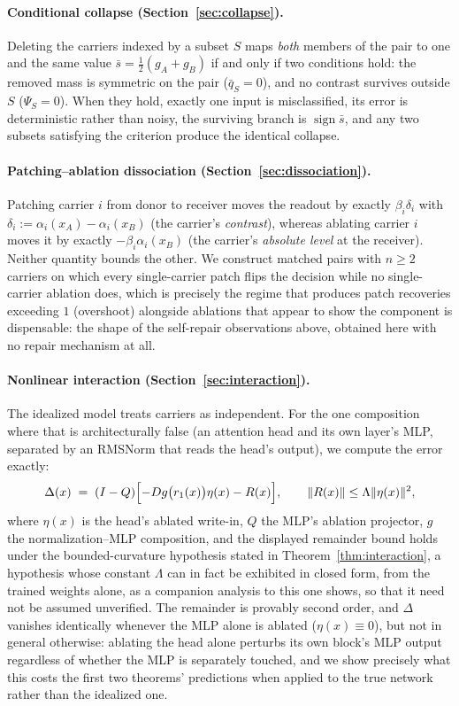 \documentclass[11pt,a4paper]{article}
\begin{document}
\paragraph{Conditional collapse (Section~\ref{sec:collapse}).} Deleting the
carriers indexed by a subset $S$ maps \emph{both} members of the pair to one
and the same value $\bar s=\tfrac12(g_A+g_B)$ if and only if two conditions
hold: the removed mass is symmetric on the pair ($\bar q_S=0$), and no
contrast survives outside $S$ ($\Psi_S=0$). When they hold, exactly one input
is misclassified, its error is deterministic rather than noisy, the surviving
branch is $\operatorname{sign}\bar s$, and any two subsets satisfying the
criterion produce the identical collapse.

\paragraph{Patching--ablation dissociation (Section~\ref{sec:dissociation}).}
Patching carrier $i$ from donor to receiver moves the readout by exactly
$\beta_i\delta_i$ with $\delta_i:=\alpha_i(x_A)-\alpha_i(x_B)$ (the
carrier's \emph{contrast}), whereas ablating carrier $i$ moves it by exactly
$-\beta_i\alpha_i(x_B)$ (the carrier's \emph{absolute level} at the
receiver). Neither quantity bounds the other. We construct matched pairs with
$n\ge2$ carriers on which every single-carrier patch flips the decision while
no single-carrier ablation does, which is precisely the regime that produces
patch recoveries exceeding $1$ (overshoot) alongside ablations that appear to
show the component is dispensable: the shape of the self-repair
observations above, obtained here with no repair mechanism at all.

\paragraph{Nonlinear interaction (Section~\ref{sec:interaction}).} The
idealized model treats carriers as independent. For the one composition where
that is architecturally false (an attention head and its own layer's MLP,
separated by an RMSNorm that reads the head's output), we compute the error
exactly:
\[
\Delta(x) \;=\; (I-Q)\Bigl[-Dg\bigl(r_1(x)\bigr)\eta(x) - R(x)\Bigr],
\qquad \|R(x)\|\le\Lambda\|\eta(x)\|^2 ,
\]
where $\eta(x)$ is the head's ablated write-in, $Q$ the MLP's ablation
projector, $g$ the normalization--MLP composition, and the displayed
remainder bound holds under the bounded-curvature hypothesis stated in
Theorem~\ref{thm:interaction}, a hypothesis whose constant $\Lambda$ can in
fact be exhibited in closed form, from the trained weights alone, as a
companion analysis to this one shows, so that it need not be assumed
unverified. The remainder is provably second order, and $\Delta$ vanishes
identically whenever the MLP alone is ablated ($\eta(x)\equiv0$), but not in
general otherwise: ablating the head alone perturbs its own block's MLP
output regardless of whether the MLP is separately touched, and we show
precisely what this costs the first two theorems' predictions when applied
to the true network rather than the idealized one.
\end{document}
